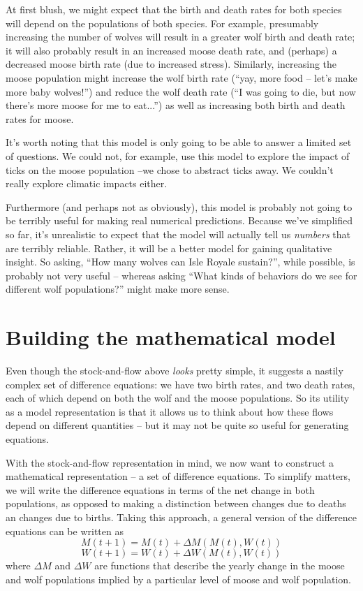 \documentclass{tufte-handout}
\begin{document}
At first blush, we might expect that the birth and death rates for both species will depend on the populations of both species.  For example, presumably increasing the number of wolves will result in a greater wolf birth and death rate; it will also probably result in an increased moose death rate, and (perhaps) a decreased moose birth rate (due to increased stress).  Similarly, increasing the moose population might increase the wolf birth rate (``yay, more food -- let's make more baby wolves!'') and reduce the wolf death rate (``I was going to die, but now there's more moose for me to eat...'') as well as increasing both birth and death rates for moose.

It's worth noting that this model is only going to be able to answer a limited set of questions.  We could not, for example, use this model to explore the impact of ticks on the moose population --we chose to abstract ticks away.  We couldn't really explore climatic impacts either.  

Furthermore (and perhaps not as obviously), this model is probably not going to be terribly useful for making real numerical predictions.  Because we've simplified so far, it's unrealistic to expect that the model will actually tell us {\it numbers} that are terribly reliable.  Rather, it will be a better model for gaining qualitative insight.  So asking, ``How many wolves can Isle Royale sustain?'', while possible, is probably not very useful -- whereas asking ``What kinds of behaviors do we see for different wolf populations?'' might make more sense.

\section{Building the mathematical model}
Even though the stock-and-flow above {\it looks} pretty simple, it suggests a nastily complex set of difference equations:  we have two birth rates, and two death rates, each of which depend on both the wolf and the moose populations.   So its utility as a model representation is that it allows us to think about how these flows depend on different quantities -- but it may not be quite so useful for generating equations.


With the stock-and-flow representation in mind, we now want to construct a mathematical representation -- a set of difference equations.  To simplify matters, we will write the difference equations in terms of the net change in both populations, as opposed to making a distinction between changes due to deaths an changes due to births.  Taking this approach, a general version of the difference equations can be written as 
$$M(t+1) = M(t) + \Delta M(M(t), W(t))$$
$$W(t+1) = W(t) + \Delta W(M(t), W(t))$$
where $\Delta M$ and $\Delta W$ are functions that describe the yearly change in the moose and wolf populations implied by a particular level of moose and wolf population.
\end{document}
